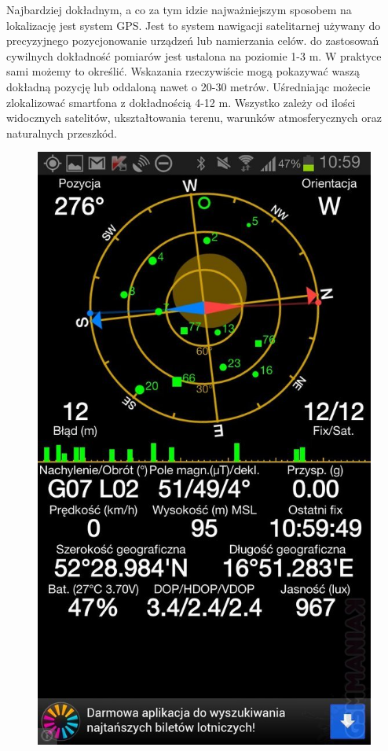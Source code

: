 Najbardziej dokładnym, a co za tym idzie najważniejszym sposobem na lokalizację jest system GPS. Jest to system nawigacji satelitarnej używany do precyzyjnego pozycjonowanie urządzeń lub namierzania celów.
do zastosowań cywilnych dokładność pomiarów jest ustalona na poziomie 1-3 m. W praktyce sami możemy to określić. Wskazania rzeczywiście mogą pokazywać waszą dokładną pozycję lub oddaloną nawet o 20-30 metrów. Uśredniając możecie zlokalizować smartfona z dokładnością 4-12 m. Wszystko zależy od ilości widocznych satelitów, ukształtowania terenu, warunków atmosferycznych oraz naturalnych przeszkód.
\begin{figure}[H]
\centering
\includegraphics[scale=0.25]{czlonkowie/5/1ss.jpg}
\end{figure}
